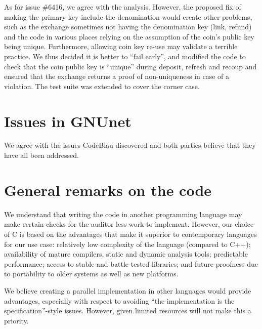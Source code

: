 \documentclass[11pt]{article}
\begin{document}
As for issue \#6416, we agree with the analysis. However, the proposed fix
of making the primary key include the denomination would create other problems,
such as the exchange sometimes not having the denomination key (link, refund)
and the code in various places relying on the assumption of the coin's
public key being unique. Furthermore, allowing coin key re-use may validate
a terrible practice. We thus decided it is better to ``fail early'', and
modified the code to check that the coin public key is ``unique'' during
deposit, refresh and recoup and ensured that the exchange returns a proof
of non-uniqueness in case of a violation. The test suite was extended to
cover the corner case.

\section{Issues in GNUnet}

We agree with the issues CodeBlau discovered and both parties believe that
they have all been addressed.

\section{General remarks on the code}

We understand that writing the code in another programming language may make
certain checks for the auditor less work to implement. However, our choice of C
is based on the advantages that make it superior to contemporary languages for
our use case:  relatively low complexity of the language (compared to C++);
availability of mature compilers, static and dynamic analysis tools;
predictable performance; access to stable and battle-tested libraries; and
future-proofness due to portability to older systems as well as new platforms.

We believe creating a parallel implementation in other languages would provide
advantages, especially with respect to avoiding ``the implementation is the
specification''-style issues.  However, given limited resources will not make
this a priority.
\end{document}
